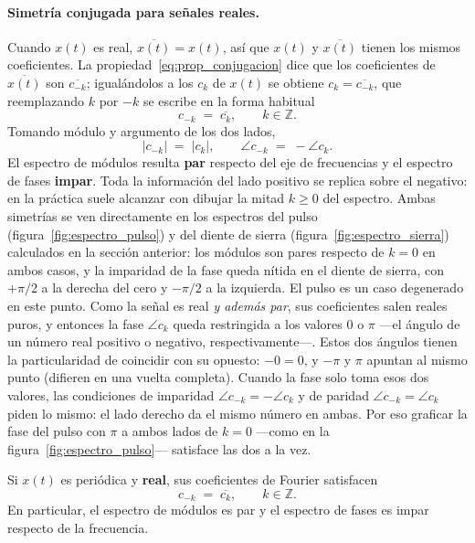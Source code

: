 \documentclass[class=book, crop=false]{standalone}
\begin{document}
\paragraph{Simetría conjugada para señales reales.}
Cuando $x(t)$ es real, $\overline{x(t)} = x(t)$, así que $x(t)$ y
$\overline{x(t)}$ tienen los mismos coeficientes. La
propiedad~\eqref{eq:prop_conjugacion} dice que los coeficientes de
$\overline{x(t)}$ son $\overline{c_{-k}}$; igualándolos a los $c_k$
de $x(t)$ se obtiene $c_k = \overline{c_{-k}}$, que reemplazando
$k$ por $-k$ se escribe en la forma habitual
\begin{equation}
    c_{-k} \;=\; \overline{c_k}, \qquad k\in\mathbb{Z}.
    \label{eq:simetria_ck}
\end{equation}
Tomando módulo y argumento de los dos lados,
\begin{equation}
    |c_{-k}| \;=\; |c_k|, \qquad
    \angle c_{-k} \;=\; -\angle c_k.
    \label{eq:simetria_espectros}
\end{equation}
El espectro de módulos resulta \textbf{par} respecto del eje de
frecuencias y el espectro de fases \textbf{impar}. Toda la
información del lado positivo se replica sobre el negativo: en la
práctica suele alcanzar con dibujar la mitad $k\geq 0$ del
espectro. Ambas simetrías se ven directamente en los espectros del
pulso (figura~\ref{fig:espectro_pulso}) y del diente de sierra
(figura~\ref{fig:espectro_sierra}) calculados en la sección
anterior: los módulos son pares respecto de $k=0$ en ambos casos,
y la imparidad de la fase queda nítida en el diente de sierra, con
$+\pi/2$ a la derecha del cero y $-\pi/2$ a la izquierda. El pulso
es un caso degenerado en este punto. Como la señal es real \emph{y
además par}, sus coeficientes salen reales puros, y entonces la
fase $\angle c_k$ queda restringida a los valores $0$ o $\pi$ ---el
ángulo de un número real positivo o negativo, respectivamente---.
Estos dos ángulos tienen la particularidad de coincidir con su
opuesto: $-0 = 0$, y $-\pi$ y $\pi$ apuntan al mismo punto
(difieren en una vuelta completa). Cuando
la fase solo toma esos dos valores, las condiciones de imparidad
$\angle c_{-k} = -\angle c_k$ y de paridad $\angle c_{-k} = \angle c_k$
piden lo mismo: el lado derecho da el mismo número en ambas. Por eso graficar la fase del pulso con $\pi$
a ambos lados de $k=0$ ---como en la
figura~\ref{fig:espectro_pulso}--- satisface las dos a la vez.

\begin{resultado}
Si $x(t)$ es periódica y \textbf{real}, sus coeficientes de Fourier
satisfacen
\begin{equation*}
    c_{-k} \;=\; \overline{c_k}, \qquad k\in\mathbb{Z}.
\end{equation*}
En particular, el espectro de módulos es par y el espectro de fases
es impar respecto de la frecuencia.
\end{resultado}
\end{document}
